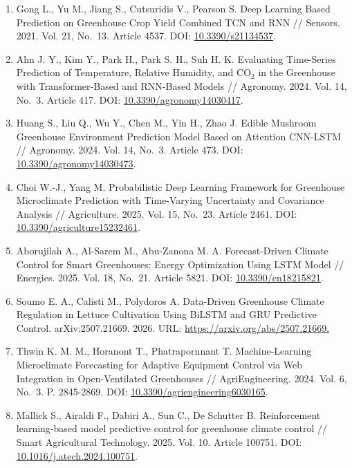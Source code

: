 \documentclass[a4paper,14pt]{extarticle}
\begin{document}
\begin{enumerate}
\item
  Gong L., Yu M., Jiang S., Cutsuridis V., Pearson S. Deep Learning
  Based Prediction on Greenhouse Crop Yield Combined TCN and RNN //
  Sensors. 2021. Vol. 21, No.~13. Article 4537. DOI:
  \href{https://doi.org/10.3390/s21134537}{10.3390/s21134537}.
\item
  Ahn J. Y., Kim Y., Park H., Park S. H., Suh H. K. Evaluating
  Time-Series Prediction of Temperature, Relative Humidity, and CO\(_2\)
  in the Greenhouse with Transformer-Based and RNN-Based Models //
  Agronomy. 2024. Vol. 14, No.~3. Article 417. DOI:
  \href{https://doi.org/10.3390/agronomy14030417}{10.3390/agronomy14030417}.
\item
  Huang S., Liu Q., Wu Y., Chen M., Yin H., Zhao J. Edible Mushroom
  Greenhouse Environment Prediction Model Based on Attention CNN-LSTM //
  Agronomy. 2024. Vol. 14, No.~3. Article 473. DOI:
  \href{https://doi.org/10.3390/agronomy14030473}{10.3390/agronomy14030473}.
\item
  Choi W.-J., Yang M. Probabilistic Deep Learning Framework for
  Greenhouse Microclimate Prediction with Time-Varying Uncertainty and
  Covariance Analysis // Agriculture. 2025. Vol. 15, No.~23. Article
  2461. DOI:
  \href{https://doi.org/10.3390/agriculture15232461}{10.3390/agriculture15232461}.
\item
  Aborujilah A., Al-Sarem M., Abu-Zanona M. A. Forecast-Driven Climate
  Control for Smart Greenhouses: Energy Optimization Using LSTM Model //
  Energies. 2025. Vol. 18, No.~21. Article 5821. DOI:
  \href{https://doi.org/10.3390/en18215821}{10.3390/en18215821}.
\item
  Soumo E. A., Calisti M., Polydoros A. Data-Driven Greenhouse Climate
  Regulation in Lettuce Cultivation Using BiLSTM and GRU Predictive
  Control. arXiv:2507.21669. 2026. URL:
  \url{https://arxiv.org/abs/2507.21669.}
\item
  Thwin K. M. M., Horanont T., Phatrapornnant T. Machine-Learning
  Microclimate Forecasting for Adaptive Equipment Control via Web
  Integration in Open-Ventilated Greenhouses // AgriEngineering. 2024.
  Vol. 6, No.~3. P. 2845-2869. DOI:
  \href{https://doi.org/10.3390/agriengineering6030165}{10.3390/agriengineering6030165}.
\item
  Mallick S., Airaldi F., Dabiri A., Sun C., De Schutter B.
  Reinforcement learning-based model predictive control for greenhouse
  climate control // Smart Agricultural Technology. 2025. Vol. 10.
  Article 100751. DOI:
  \href{https://doi.org/10.1016/j.atech.2024.100751}{10.1016/j.atech.2024.100751}.

\end{enumerate}
\end{document}
